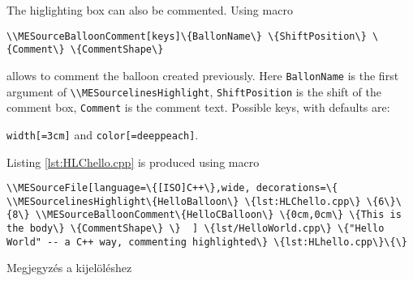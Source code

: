 
{
The higlighting box can also be commented. Using macro
\par\noindent\lstinline|\\MESourceBalloonComment[keys]\{BallonName\} \{ShiftPosition\} \{Comment\} \{CommentShape\}|
\par\noindent allows to comment the balloon created previously.
Here \lstinline|BallonName| is the first argument of  \lstinline|\\MESourcelinesHighlight|,
\lstinline|ShiftPosition| is the shift of the comment box, \lstinline|Comment| is the comment text.
Possible keys, with defaults are:
\par\noindent \lstinline|width[=3cm]| and \lstinline|color[=deeppeach]|.

Listing \ref{lst:HLChello.cpp} is produced using macro
\par\noindent\lstinline|\\MESourceFile[language=\{[ISO]C++\},wide,
decorations=\{
\\MESourcelinesHighlight\{HelloBalloon\} \{lst:HLChello.cpp\} \{6\}\{8\}
\\MESourceBalloonComment\{HelloCBalloon\} \{0cm,0cm\} \{This is the body\} \{CommentShape\}
\} 
] \{lst/HelloWorld.cpp\} \{"Hello World" -- a C++ way, commenting highlighted\} \{lst:HLhello.cpp\}\{\}|

}
{Megjegyzés a kijelöléshez}
